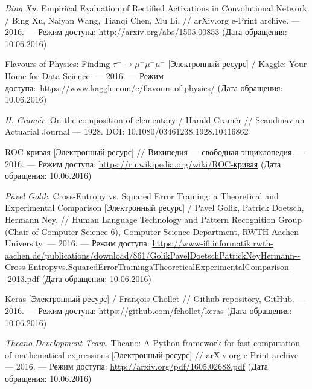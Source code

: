 \documentclass[14pt, a4paper]{extarticle}
\begin{document}
\begin{thebibliography}{3}
\textit{Bing Xu.} Empirical Evaluation of Rectified Activations in Convolutional Network / Bing Xu, Naiyan Wang, Tianqi Chen, Mu Li. // arXiv.org e-Print archive. — 2016. — Режим доступа: \url{http://arxiv.org/abs/1505.00853} (Дата обращения: 10.06.2016)

 Flavours of Physics: Finding $\tau^-\rightarrow\mu^+ \mu^- \mu^-$ [Электронный ресурс] / Kaggle: Your Home for Data Science. — 2016. — Режим доступа: \url{https://www.kaggle.com/c/flavours-of-physics/} (Дата обращения: 10.06.2016)

\textit{H. Cram\'er.} On the composition of elementary / Harald Cramér // Scandinavian Actuarial Journal — 1928. DOI: 10.1080/03461238.1928.10416862 %

ROC-кривая [Электронный ресурс] // Википедия — свободная энциклопедия. — 2016. — Режим доступа: \url{https://ru.wikipedia.org/wiki/ROC-кривая} (Дата обращения: 10.06.2016)

\textit{Pavel Golik.} Cross-Entropy vs. Squared Error Training: a Theoretical and Experimental Comparison [Электронный ресурс] / Pavel Golik, Patrick Doetsch, Hermann Ney. // Human Language Technology and Pattern Recognition Group (Chair of Computer Science 6), Computer Science Department, RWTH Aachen University. — 2016. — Режим доступа: \url{https://www-i6.informatik.rwth-aachen.de/publications/download/861/GolikPavelDoetschPatrickNeyHermann--Cross-Entropyvs.SquaredErrorTrainingaTheoreticalExperimentalComparison--2013.pdf} (Дата обращения: 10.06.2016)

Keras [Электронный ресурс] / François Chollet // Github repository, GitHub. —  2016. — Режим доступа: \url{https://github.com/fchollet/keras} (Дата обращения: 10.06.2016)

\textit{Theano Development Team.} Theano: A Python framework for fast computation of mathematical expressions [Электронный ресурс] // arXiv.org e-Print archive — 2016. — Режим доступа: \url{http://arxiv.org/pdf/1605.02688.pdf} (Дата обращения: 10.06.2016)

\end{thebibliography}

\label{page:last}
\end{document}
